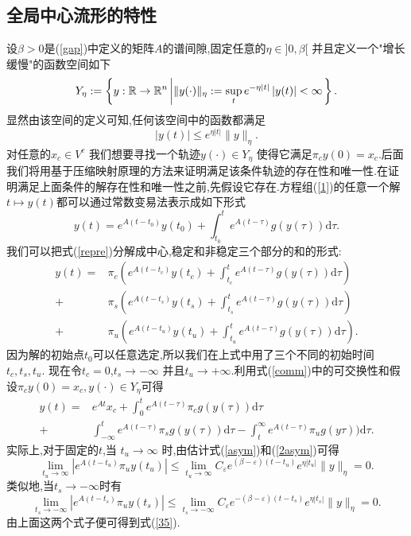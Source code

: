 \subsection{全局中心流形的特性}
设$\beta>0$是(\ref{gap})中定义的矩阵$A$的谱间隙,固定任意的$\eta \in  ]0,\beta[$ 并且定义一个"增长缓慢"的函数空间如下
\[
Y_{\eta}:=\left\{ y:\mathbb{R}\to \mathbb{R}^{n}\left| \|y(\cdot )\|_{\eta}:=\sup_{t}e^{-\eta\left| t \right|  }\left| y(t) \right|<\infty \right. \right\} 
.\] 
显然由该空间的定义可知,任何该空间中的函数都满足
\begin{equation}
  \left| y(t) \right| \le e^{\eta\left| t \right| }\|y\|_{\eta}.\label{2asym}
\end{equation}
对任意的$x_c\in V^{c}$ 我们想要寻找一个轨迹$y(\cdot )\in  Y_\eta$ 使得它满足$\pi_cy(0)=x_c$.后面我们将用基于压缩映射原理的方法来证明满足该条件轨迹的存在性和唯一性.在证明满足上面条件的解存在性和唯一性之前,先假设它存在.方程组(\ref{1})的任意一个解$t\mapsto y(t)$都可以通过常数变易法表示成如下形式
\begin{equation}
  y(t)=e^{A(t-t_0)}y(t_0)+\int_{t_0}^{t}e^{A(t-\tau)}g(y(\tau))\mathrm{d}\tau.\label{repre}
\end{equation}
我们可以把式(\ref{repre})分解成中心,稳定和非稳定三个部分的和的形式:
\begin{equation}
  \begin{aligned}
    y(t)=& \pi_c\left( e^{A(t-t_c)}y(t_c)+\int_{t_c}^{t}e^{A(t-\tau)}g(y(\tau))\mathrm{d}\tau \right)\\
    +& \pi_s\left( e^{A(t-t_s)}y(t_s)+\int_{t_s}^{t}e^{A(t-\tau)}g(y(\tau))\mathrm{d}\tau \right) \\
    +& \pi_u\left( e^{A(t-t_u)}y(t_u)+\int_{t_u}^{t}e^{A(t-\tau)}g(y(\tau))\mathrm{d}\tau \right).
  \end{aligned}\label{solu}
\end{equation}
因为解的初始点$t_0$可以任意选定,所以我们在上式中用了三个不同的初始时间 $t_c,t_s,t_u$.
现在令$t_c=0$,$t_s\to -\infty$ 并且$t_u\to +\infty$.利用式(\ref{comm})中的可交换性和假设$\pi_cy(0)=x_c,y(\cdot )\in Y_\eta$可得
\begin{equation}
  \begin{aligned}
    y(t) = & e^{At}x_c+\int_0^{t}e^{A(t-\tau)}\pi_c g(y(\tau))\mathrm{d}\tau\\
    +& \int_{-\infty}^{t}e^{A(t-\tau)}\pi_s g(y(\tau))\mathrm{d}\tau-\int_{t}^{\infty}e^{A(t-\tau)}\pi_ug(y\tau))\mathrm{d}\tau.
  \end{aligned}\label{35}
\end{equation}
实际上,对于固定的$t$,当 $t_u\to \infty$ 时,由估计式(\ref{asym})和(\ref{2asym})可得
\begin{equation}
  \lim_{t_u\to \infty}\left| e^{A(t-t_u)}\pi_uy(t_u) \right| \le \lim_{t_u\to \infty}C_\varepsilon e^{(\beta-\varepsilon )(t-t_u)}e^{\eta\left| t_u \right| }\|y\|_{\eta}=0.
\end{equation}
类似地,当$t_s\to -\infty$时有
\begin{equation}
  \lim_{t_s\to -\infty}\left| e^{A(t-t_s)}\pi_uy(t_s) \right| \le \lim_{t_s\to -\infty}C_\varepsilon e^{-(\beta-\varepsilon )(t-t_s)}e^{\eta\left| t_s \right| }\|y\|_{\eta}=0. 
\end{equation}
由上面这两个式子便可得到式(\ref{35}).
